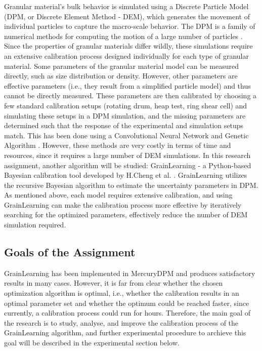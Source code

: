 \documentclass{article}
\begin{document}
Granular material's bulk behavior is simulated using a Discrete Particle Model (DPM, or Discrete Element Method - DEM), which generates the movement of individual particles to capture the macro-scale behavior. The DPM is a family of numerical methods for computing the motion of a large number of particles \cite{Weng:2015}. Since the properties of granular materials differ wildly, these simulations require an extensive calibration process designed individually for each type of granular material. Some parameters of the granular material model can be measured directly, such as size distribution or density. However, other parameters are effective parameters (i.e., they result from a simplified particle model) and thus cannot be directly measured. These parameters are then calibrated by choosing a few standard calibration setups (rotating drum, heap test, ring shear cell) and simulating these setups in a DPM simulation, and the missing parameters are determined such that the response of the experimental and simulation setups match. This has been done using a Convolutional Neural Network \cite{nn-calibration} and Genetic Algorithm \cite{ga-calibration}. However, these methods are very costly in terms of  time and resources, since it requires a large number of DEM simulations. In this research assignment, another algorithm will be studied: GrainLearning - a Python-based Bayesian calibration tool developed by H.Cheng et al. \cite{grainLearning}. GrainLearning utilizes the recursive Bayesian algorithm to estimate the uncertainty parameters in DPM. As mentioned above, each model requires extensive calibration, and using GrainLearning can make the calibration process more effective by iteratively searching for the optimized parameters, effectively reduce the number of DEM simulation required.

\subsection{Goals of the Assignment}

GrainLearning has been implemented in MercuryDPM and produces satisfactory results in many cases. However, it is far from clear whether the chosen optimization algorithm is optimal, i.e., whether the calibration results in an optimal parameter set and whether the optimum could be reached faster, since currently, a calibration process could run for hours. Therefore, the main goal of the research is to study, analyse, and improve the calibration process of the GrainLearning algorithm, and further experimental procedure to archieve this goal will be described in the experimental section below. 
\end{document}
